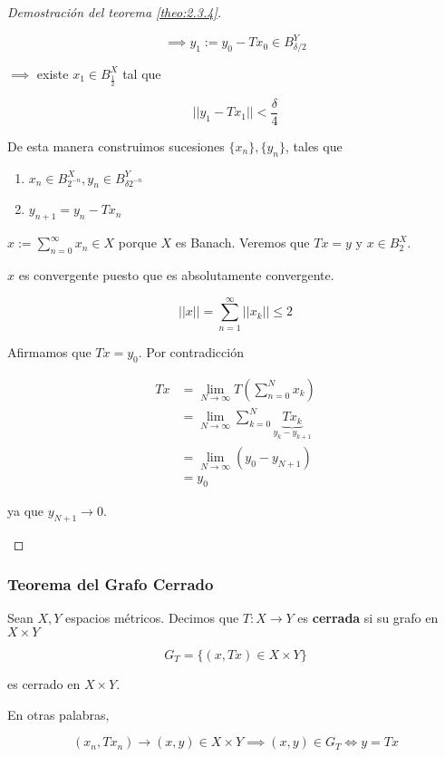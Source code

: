 \begin{proof}[Demostración del teorema \ref{theo:2.3.4}]
\begin{enumerate}
        \[\implies y_1:=y_0-Tx_0\in B_{\delta/2}^Y\]

        $\implies$ existe $x_1\in B_{\frac{1}{2}}^X$ tal que 

        \[||y_1-Tx_1||<\frac{\delta}{4}\]

        De esta manera construimos sucesiones $\{x_n\},\{y_n\}$, tales que

        \begin{enumerate}
            \item $x_n\in B_{2^{-n}}^X, y_n\in B_{\delta 2^{-n}}^Y$
            \item $y_{n+1}=y_n-Tx_n$
        \end{enumerate}

        $x:=\displaystyle\sum_{n=0}^\infty x_n\in X$ porque $X$ es Banach. Veremos que $Tx=y$ y $x\in B_2^X$.

        $x$ es convergente puesto que es absolutamente convergente.

        \[||x||=\sum_{n=1}^\infty ||x_k||\leq 2\]

        Afirmamos que $Tx=y_0$. Por contradicción

        \begin{align*}Tx&=\lim_{N\to\infty} T(\sum_{n=0}^N x_k)\\
        &=\lim_{N\to\infty} \sum_{k=0}^N \underbrace{Tx_k}_{y_k-y_{k+1}}\\
        &=\lim_{N\to\infty} (y_0-y_{N+1})\\\
        &=y_0
    \end{align*}

    ya que $y_{N+1}\to 0$.
    \end{enumerate}
\end{proof}

\subsubsection*{Teorema del Grafo Cerrado}

\begin{fdefinition}
    Sean $X,Y$ espacios métricos. Decimos que $T:X\to Y$ es \textbf{cerrada} si su grafo en $X\times Y$

    \[G_T=\{(x,Tx)\in X\times Y\}\]

    es cerrado en $X\times Y$.
\end{fdefinition}

En otras palabras,

\[(x_n,Tx_n)\to (x,y)\in X\times Y\implies (x,y)\in G_T\iff y=Tx\]

